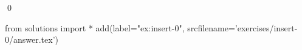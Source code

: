 
\begin{ex} 
  \label{ex:insert-0}
  
  \qed
\end{ex} 
\begin{python0}
from solutions import *
add(label="ex:insert-0",
    srcfilename='exercises/insert-0/answer.tex') 
\end{python0}
